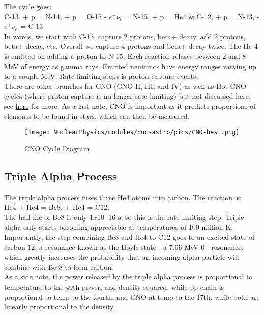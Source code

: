             The cycle goes:\\
            \newline
            C-13, + p = N-14, + p = O-15 - $e^+ \nu_e$ = N-15, + p =  He4 \& C-12, + p = N-13, -  $e^+ \nu_e$ = C-13\\
            \newline
            In words, we start with C-13, capture 2 protons, beta+ decay, add 2 protons, beta+ decay, etc. Overall we capture 4 protons and beta+ decay twice. The He-4 is emitted on adding a proton to N-15. Each reaction relases between 2 and 8 MeV of energy as gamma rays. Emitted neutrinos have energy ranges varying up to a couple MeV. Rate limiting steps is proton capture events. \\
            There are other branches for CNO (CNO-II, III, and IV) as well as Hot CNO cycles (where proton capture is no longer rate limiting) but not discussed here, see \href{https://en.wikipedia.org/wiki/CNO_cycle}{here} for more. As a last note, CNO is important as it predicts proportions of elements to be found in stars, which can then be measured. 
            
                        
            \begin{figure}[H]
                \centering
                \texttt{[image: NuclearPhysics/modules/nuc-astro/pics/CNO-best.png]}
            \caption{CNO Cycle Diagram}
            \end{figure}
            
        \subsection{Triple Alpha Process}
            The triple alpha process fuses three He4 atoms into carbon. The reaction is:\\
            \newline
            He4 + He4 = Be8, + He4 = C12.\\
            \newline
            The half life of Be8 is only $1x10^-16$ s, so this is the rate limiting step. Triple alpha only starts becoming appreciable at temperatures of 100 million K. Importantly, the step combining Be8 and He4 to C12 goes to an excited state of carbon-12, a resonance known as the Hoyle state - a 7.66 MeV $0^+$ resonance, which greatly increases the probability that an incoming alpha particle will combine with Be-8 to form carbon. \\
            As a side note, the power released by the triple alpha process is proportional to temperature to the 40th power, and density squared, while pp-chain is proportional to temp to the fourth, and CNO at temp to the 17th, while both are linearly proportional to the density. 
             

